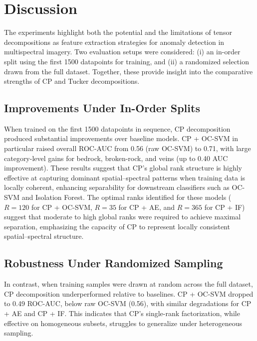 \documentclass[11pt]{article}
\begin{document}
\section{Discussion}

The experiments highlight both the potential and the limitations of tensor decompositions as feature extraction strategies for anomaly detection in multispectral imagery. Two evaluation setups were considered: (i) an in-order split using the first 1500 datapoints for training, and (ii) a randomized selection drawn from the full dataset. Together, these provide insight into the comparative strengths of CP and Tucker decompositions.  

\subsection{Improvements Under In-Order Splits}

When trained on the first 1500 datapoints in sequence, CP decomposition produced substantial improvements over baseline models. CP + OC-SVM in particular raised overall ROC-AUC from 0.56 (raw OC-SVM) to 0.71, with large category-level gains for bedrock, broken-rock, and veins (up to 0.40 AUC improvement). These results suggest that CP’s global rank structure is highly effective at capturing dominant spatial–spectral patterns when training data is locally coherent, enhancing separability for downstream classifiers such as OC-SVM and Isolation Forest. The optimal ranks identified for these models (\(R=120\) for CP + OC-SVM, \(R=35\) for CP + AE, and \(R=365\) for CP + IF) suggest that moderate to high global ranks were required to achieve maximal separation, emphasizing the capacity of CP to represent locally consistent spatial–spectral structure.  

\subsection{Robustness Under Randomized Sampling}

In contrast, when training samples were drawn at random across the full dataset, CP decomposition underperformed relative to baselines. CP + OC-SVM dropped to 0.49 ROC-AUC, below raw OC-SVM (0.56), with similar degradations for CP + AE and CP + IF. This indicates that CP’s single-rank factorization, while effective on homogeneous subsets, struggles to generalize under heterogeneous sampling.  
\end{document}
